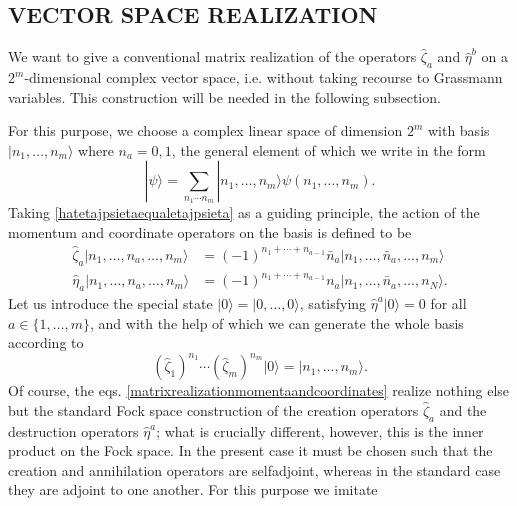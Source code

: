\documentclass[a4paper,10pt]{article}
\begin{document}
\subsection{VECTOR SPACE REALIZATION}

We want to give a conventional matrix realization of the operators  $\hat{\zeta}_a$ and 
$\hat{\eta}^b$ on a $2^m$-dimensional complex vector space, i.e. without taking recourse 
to Grassmann variables. This construction will be needed in the following subsection.

For this purpose, we choose a complex linear space of dimension $2^m$ with basis 
$|n_1,\ldots,n_m\rangle$ where $n_a=0,1$, the general element of which we write in the 
form
\begin{equation}\label{verticalbarpsirangleintermsofthevectorspacebasis}
|\psi\rangle=\sum_{n_1\cdots n_m}|n_1,\ldots,n_m\rangle\psi(n_1,\ldots,n_m).
\end{equation}
Taking \eqref{hatetajpsietaequaletajpsieta} as a guiding principle, the action of the 
momentum and coordinate operators on the basis is defined to be
\begin{equation}
\begin{split}\label{matrixrealizationmomentaandcoordinates}
\hat{\zeta}_a|n_1,\ldots,n_a,\ldots,n_m\rangle&=(-1)^{n_1+\cdots+n_{a-
1}}\bar{n}_a|n_1,\ldots,\bar{n}_a,\ldots,n_m\rangle
\\
\hat{\eta}_a|n_1,\ldots,n_a,\ldots,n_m\rangle&=(-1)^{n_1+\cdots+n_{a-
1}}n_a|n_1,\ldots,\bar{n}_a,\ldots,n_N\rangle.
\end{split}
\end{equation}
Let us introduce the special state $|0\rangle=|0,\ldots,0\rangle$, satisfying 
$\hat{\eta}^a|0\rangle=0$ for all $a\in\{1,\ldots,m\}$, and with the help of which we can 
generate the whole basis according to
\begin{equation}\label{definitionbasisfromlowestweightstate}
(\hat{\zeta}_1)^{n_1}\cdots(\hat{\zeta}_m)^{n_m}|0\rangle=|n_1,\ldots,n_m\rangle.
\end{equation}
Of course, the eqs. \eqref{matrixrealizationmomentaandcoordinates} realize nothing else 
but the standard Fock space construction of the creation operators $\hat{\zeta}_a$ and 
the destruction operators $\hat{\eta}^a$; what is crucially different, however, this is 
the inner product on the Fock space. In the present case it must be chosen such that the 
creation and annihilation operators are selfadjoint, whereas in the standard case they 
are adjoint to one another. For this purpose we imitate 
\end{document}
